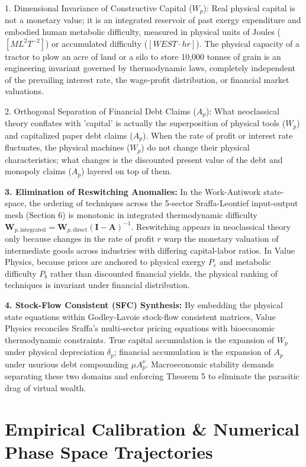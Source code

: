 \documentclass[preprint,12pt,authoryear]{elsarticle}
\theoremstyle{definition}
\begin{document}
1. Dimensional Invariance of Constructive Capital ($W_p$): Real physical capital is not a monetary value; it is an integrated reservoir of past exergy expenditure and embodied human metabolic difficulty, measured in physical units of Joules ($[M L^2 T^{-2}]$) or accumulated difficulty ($[WEST \cdot hr]$). The physical capacity of a tractor to plow an acre of land or a silo to store 10,000 tonnes of grain is an engineering invariant governed by thermodynamic laws, completely independent of the prevailing interest rate, the wage-profit distribution, or financial market valuations.

2. Orthogonal Separation of Financial Debt Claims ($A_p$): What neoclassical theory conflates with 'capital' is actually the superposition of physical tools ($W_p$) and capitalized paper debt claims ($A_p$). When the rate of profit or interest rate fluctuates, the physical machines ($W_p$) do not change their physical characteristics; what changes is the discounted present value of the debt and monopoly claims ($A_p$) layered on top of them.

\textbf{3. Elimination of Reswitching Anomalies:} In the Work-Antiwork state-space, the ordering of techniques across the 5-sector Sraffa-Leontief input-output mesh (Section 6) is monotonic in integrated thermodynamic difficulty $\mathbf{W}_{p,\text{integrated}} = \mathbf{W}_{p,\text{direct}}(\mathbf{I} - \mathbf{A})^{-1}$. Reswitching appears in neoclassical theory only because changes in the rate of profit $r$ warp the monetary valuation of intermediate goods across industries with differing capital-labor ratios. In Value Physics, because prices are anchored to physical exergy $P_e$ and metabolic difficulty $P_b$ rather than discounted financial yields, the physical ranking of techniques is invariant under financial distribution.

\textbf{4. Stock-Flow Consistent (SFC) Synthesis:} By embedding the physical state equations within Godley-Lavoie stock-flow consistent matrices, Value Physics reconciles Sraffa's multi-sector pricing equations with bioeconomic thermodynamic constraints. True capital accumulation is the expansion of $W_p$ under physical depreciation $\delta_p$; financial accumulation is the expansion of $A_p$ under usurious debt compounding $\mu A_p^\nu$. Macroeconomic stability demands separating these two domains and enforcing Theorem 5 to eliminate the parasitic drag of virtual wealth.

\section{Empirical Calibration \& Numerical Phase Space Trajectories}
\end{document}
